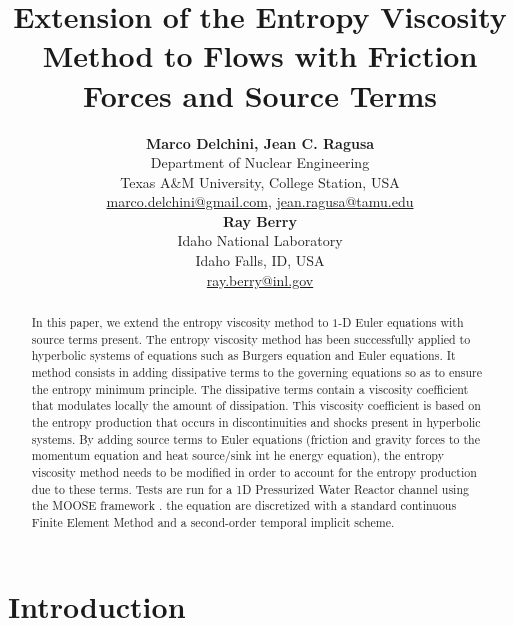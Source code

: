 \documentclass[12pt]{article}
\title{Extension of the Entropy Viscosity Method to Flows with Friction Forces and Source Terms}
\author{ 
  \textbf{Marco Delchini, Jean C. Ragusa} \\
  Department of Nuclear Engineering \\
  Texas A\&M University, College Station, USA\\
  \href{mailto:marco.delchini@gmail.com}{marco.delchini@gmail.com}, 
  \href{mailto:jean.ragusa@tamu.edu}{jean.ragusa@tamu.edu}\\
  \textbf{Ray Berry} \\
  Idaho National Laboratory\\
  Idaho Falls, ID, USA\\
  \href{mailto:ray.berry@inl.gov}{ray.berry@inl.gov}
}
\begin{document}


\maketitle

\begin{abstract}
In this paper, we extend the entropy viscosity method \cite{valentin, jlg1, jlg2} to $1$-D Euler equations with source terms present. 
The entropy viscosity method has been successfully applied to hyperbolic systems of equations such as Burgers equation and Euler
equations. It method consists in adding dissipative terms to the governing equations so as to ensure the entropy minimum principle. The dissipative terms contain a viscosity coefficient that modulates locally the amount of dissipation.
This viscosity coefficient is based on the entropy production that occurs in discontinuities and shocks present in hyperbolic systems.
By adding source terms to Euler equations (friction and gravity forces to the momentum equation and heat source/sink int he energy equation), the entropy viscosity method needs to be modified in order to account for the entropy production due to these terms. Tests are run for a 1D Pressurized Water Reactor channel using the MOOSE framework \cite{Moose}. the equation are discretized with a standard continuous Finite Element Method and a second-order temporal implicit scheme.
\end{abstract}


%
\section{Introduction}
\label{sect::intro}
\end{document}
